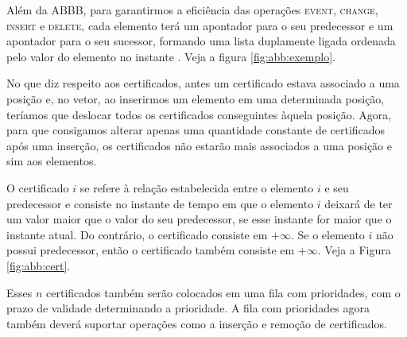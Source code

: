 Além da ABBB, para garantirmos a eficiência das
operações \textsc{event}, \textsc{change}, \textsc{insert} e
\textsc{delete}, cada elemento terá um apontador para o seu
predecessor e um apontador para o seu sucessor, formando
uma lista duplamente ligada ordenada pelo valor do elemento
no instante \now. Veja a figura \ref{fig:abb:exemplo}.



No que diz respeito aos certificados, antes um certificado estava
associado a uma posição e, no vetor, ao inserirmos um elemento em
uma determinada posição, teríamos que deslocar %
todos os certificados conseguintes àquela posição. Agora, para que
consigamos alterar apenas uma quantidade constante de certificados
após uma inserção, os certificados não estarão mais associados a uma
posição e sim aos elementos.

O certificado $i$ se refere à relação estabelecida entre o elemento
$i$ e seu predecessor e consiste no instante de tempo em que o
elemento $i$ deixará de ter um valor maior que o valor do seu
predecessor, se esse instante for maior que o instante atual. Do
contrário, o certificado consiste em $+\infty$. Se o elemento $i$
não possui predecessor, então o certificado também consiste em
$+\infty$. Veja a Figura \ref{fig:abb:cert}.

Esses $n$ certificados também serão colocados em uma fila com
prioridades, com o prazo de validade determinando a prioridade.
A fila com prioridades agora também deverá suportar operações
como a inserção e remoção de certificados.




